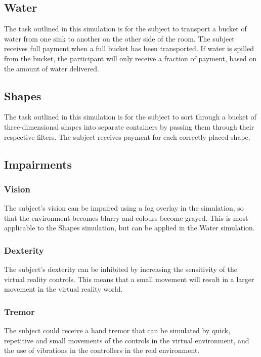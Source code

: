 \documentclass{article}
\begin{document}
\subsection*{Water}

The task outlined in this simulation is for the subject to transport a bucket of water from one sink to another on the other side of the room. The subject receives full payment when a full bucket has been transported. If water is spilled from the bucket, the participant will only receive a fraction of payment, based on the amount of water delivered.

\subsection*{Shapes}

The task outlined in this simulation is for the subject to sort through a bucket of three-dimensional shapes into separate containers by passing them through their respective filters. The subject receives payment for each correctly placed shape.

\subsection*{Impairments}

\subsubsection*{Vision}
The subject's vision can be impaired using a fog overlay in the simulation, so that the environment becomes blurry and colours become grayed. This is most applicable to the Shapes simulation, but can be applied in the Water simulation.

\subsubsection*{Dexterity}
The subject's dexterity can be inhibited by increasing the sensitivity of the virtual reality controls. This means that a small movement will result in a larger movement in the virtual reality world.

\subsubsection*{Tremor}
The subject could receive a hand tremor that can be simulated by quick, repetitive and small movements of the controls in the virtual environment, and the use of vibrations in the controllers in the real environment.
\end{document}
